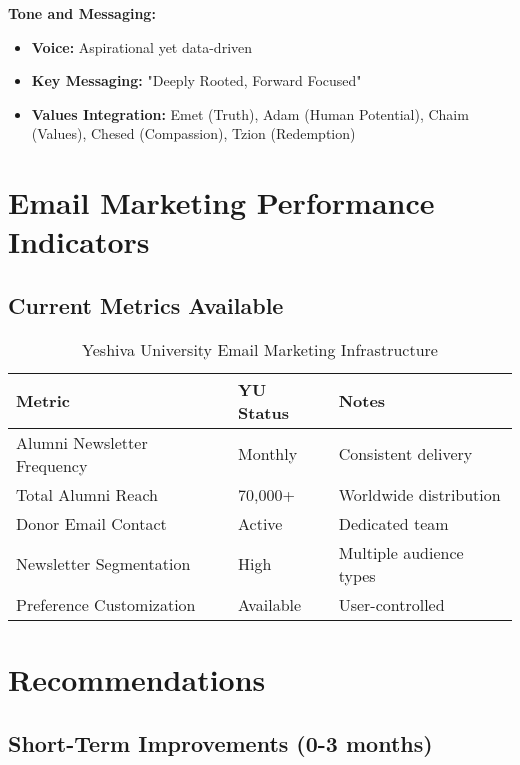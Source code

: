 \documentclass[12pt,letterpaper]{article}
\begin{document}
\textbf{Tone and Messaging:}
\begin{itemize}[leftmargin=*]
    \item \textbf{Voice:} Aspirational yet data-driven
    \item \textbf{Key Messaging:} "Deeply Rooted, Forward Focused"
    \item \textbf{Values Integration:} Emet (Truth), Adam (Human Potential), Chaim (Values), Chesed (Compassion), Tzion (Redemption)
\end{itemize}

\section{Email Marketing Performance Indicators}

\subsection{Current Metrics Available}

\begin{table}[h]
\centering
\begin{tabular}{@{}lll@{}}
\toprule
\textbf{Metric} & \textbf{YU Status} & \textbf{Notes} \\
\midrule
Alumni Newsletter Frequency & Monthly & Consistent delivery \\
Total Alumni Reach & 70,000+ & Worldwide distribution \\
Donor Email Contact & Active & Dedicated team \\
Newsletter Segmentation & High & Multiple audience types \\
Preference Customization & Available & User-controlled \\
\bottomrule
\end{tabular}
\caption{Yeshiva University Email Marketing Infrastructure}
\end{table}

\section{Recommendations}

\subsection{Short-Term Improvements (0-3 months)}
\end{document}
